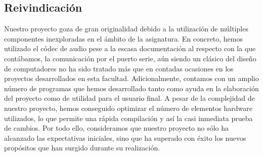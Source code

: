 \documentclass{article}
\begin{document}
\subsection{Reivindicación}
Nuestro proyecto goza de gran originalidad debido a la utilización de múltiples componentes inexploradas en el ámbito de la asignatura. En concreto, hemos utilizado el códec de audio pese a la escasa documentación al respecto con la que contábamos, la comunicación por el puerto serie, aún siendo un clásico del diseño de computadores no ha sido tratado más que en contadas ocasiones en los proyectos desarrollados en esta facultad.
Adicionalmente, contamos con un amplio número de programas que hemos desarrollado tanto como ayuda en la elaboración del proyecto como de utilidad para el usuario final.
A pesar de la complejidad de nuestro proyecto, hemos conseguido optimizar el número de elementos hardware utilizados, lo que permite una rápida compilación y así la casi inmediata prueba de cambios.
Por todo ello, consideramos que nuestro proyecto no sólo ha alcanzado las expectativas iniciales, sino que ha superado con éxito los nuevos propósitos que han surgido durante su realización.

\newpage
{} {}


\end{document}
